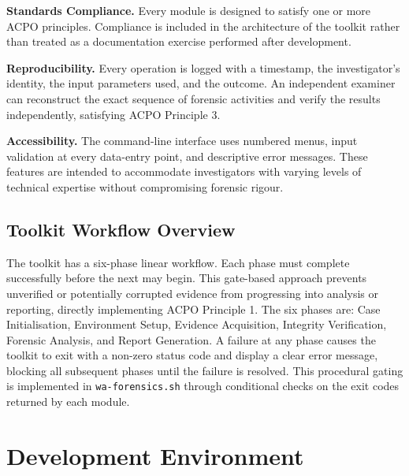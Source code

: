 \documentclass[12pt,a4paper]{report}
\begin{document}
\textbf{Standards Compliance.} Every module is designed to satisfy one or more ACPO principles. Compliance is included in the architecture of the toolkit rather than treated as a documentation exercise performed after development.

\textbf{Reproducibility.} Every operation is logged with a timestamp, the investigator's identity, the input parameters used, and the outcome. An independent examiner can reconstruct the exact sequence of forensic activities and verify the results independently, satisfying ACPO Principle 3.

\textbf{Accessibility.} The command-line interface uses numbered menus, input validation at every data-entry point, and descriptive error messages. These features are intended to accommodate investigators with varying levels of technical expertise without compromising forensic rigour.

\subsection{Toolkit Workflow Overview}

The toolkit has a six-phase linear workflow. Each phase must complete successfully before the next may begin. This gate-based approach prevents unverified or potentially corrupted evidence from progressing into analysis or reporting, directly implementing ACPO Principle 1. The six phases are: Case Initialisation, Environment Setup, Evidence Acquisition, Integrity Verification, Forensic Analysis, and Report Generation. A failure at any phase causes the toolkit to exit with a non-zero status code and display a clear error message, blocking all subsequent phases until the failure is resolved. This procedural gating is implemented in \texttt{wa-forensics.sh} through conditional checks on the exit codes returned by each module.


\section{Development Environment}
\end{document}
